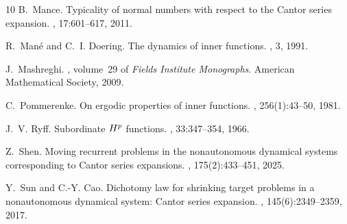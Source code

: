 \documentclass[11pt,reqno]{amsart}
\newcommand{\0}{\mathbf{0}}
\theoremstyle{remark}
\numberwithin{equation}{section}
\theoremstyle{remark}
\numberwithin{equation}{section}
\begin{document}
\begin{thebibliography}{10}
B.~Mance.
\newblock Typicality of normal numbers with respect to the {C}antor series
  expansion.
, 17:601--617, 2011.

R.~Mané and C.~I. Doering.
\newblock The dynamics of inner functions.
, 3, 1991.

J.~Mashreghi.
, volume~29 of {\em Fields
  Institute Monographs}.
\newblock American Mathematical Society, 2009.

C.~Pommerenke.
\newblock On ergodic properties of inner functions.
, 256(1):43--50, 1981.

J.~V. Ryff.
\newblock Subordinate {$H\sp{p}$} functions.
, 33:347--354, 1966.

Z.~Shen.
\newblock Moving recurrent problems in the nonautonomous dynamical systems
  corresponding to {C}antor series expansions.
, 175(2):433--451, 2025.

Y.~Sun and C.-Y. Cao.
\newblock Dichotomy law for shrinking target problems in a nonautonomous
  dynamical system: {C}antor series expansion.
, 145(6):2349--2359, 2017.

\end{thebibliography}
\end{document}
